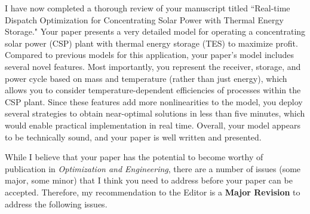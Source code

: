 \documentclass[10pt]{article}
\begin{document}
I have now completed a thorough review of your manuscript titled ``Real-time
Dispatch Optimization for Concentrating Solar Power with Thermal Energy
Storage." Your paper presents a very detailed model for operating a concentrating solar
power (CSP) plant with thermal energy storage (TES) to maximize profit.
Compared to previous models for this application, your paper's model includes
several novel features. Most importantly, you represent the receiver, storage,
and power cycle based on mass and temperature (rather than just energy), which
allows you to consider temperature-dependent efficiencies of processes within
the CSP plant. Since these features add more nonlinearities to the model, you
deploy several strategies to obtain near-optimal solutions in less than five
minutes, which would enable practical implementation in real time. Overall,
your model appears to be technically sound, and your paper is well written and
presented.

While I believe that your paper has the potential to become worthy of
publication in {\it Optimization and Engineering}, there are a number of issues (some
major, some minor) that I think you need to address before your paper can be
accepted. Therefore, my recommendation to the Editor is a {\bf Major Revision} to
address the following issues.
\end{document}
